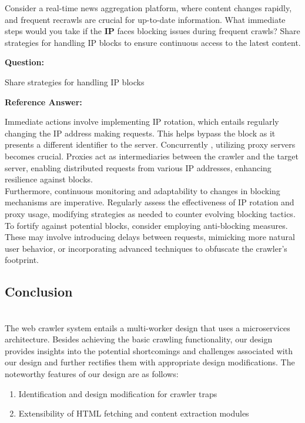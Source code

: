Consider a real-time news aggregation platform, where content changes rapidly, and frequent recrawls are crucial for up-to-date information. What immediate steps would you take if the \textbf{IP} faces blocking issues during frequent crawls? Share strategies for handling IP blocks to ensure continuous access to the latest content.

\textbf{Question:}

Share strategies for handling IP blocks

\textbf{Reference Answer:}

Immediate actions involve implementing IP rotation, which entails regularly changing the IP address making requests. This helps bypass the block as it presents a different identifier to the server. Concurrently , utilizing proxy servers becomes crucial. Proxies act as intermediaries between the crawler and the target server, enabling distributed requests from various IP addresses, enhancing resilience against blocks.
\\
Furthermore, continuous monitoring and adaptability to changes in blocking mechanisms are imperative. Regularly assess the effectiveness of IP rotation and proxy usage, modifying strategies as needed to counter evolving blocking tactics.
\\
To fortify against potential blocks, consider employing anti-blocking measures. These may involve introducing delays between requests, mimicking more natural user behavior, or incorporating advanced techniques to obfuscate the crawler's footprint.

\subsection{Conclusion}\label{numadAThKIOpX2rqvGgfK}
\\
The web crawler system entails a multi-worker design that uses a microservices architecture. Besides achieving the basic crawling functionality, our design provides insights into the potential shortcomings and challenges associated with our design and further rectifies them with appropriate design modifications. The noteworthy features of our design are as follows:

\begin{enumerate}
\item
\protect{}\label{2qsbYSN-WcXcm4jZGxO2k}
Identification and design modification for crawler traps
\item
\protect{}\label{haQWv_83wNwYrRFZzYEHK}
Extensibility of HTML fetching and content extraction modules
\end{enumerate}

